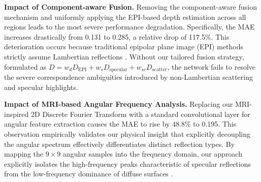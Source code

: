 \documentclass[lettersize,journal]{IEEEtran}
\begin{document}
\begin{table}[htbp]
\centering
\caption{Ablation study on key components of the proposed unified dual-mask physical model.}
\label{tab:ablation}
\end{table}

\textbf{Impact of Component-aware Fusion.} Removing the component-aware fusion mechanism and uniformly applying the EPI-based depth estimation across all regions leads to the most severe performance degradation. Specifically, the MAE increases drastically from 0.131 to 0.285, a relative drop of 117.5\%. This deterioration occurs because traditional epipolar plane image (EPI) methods strictly assume Lambertian reflections \cite{heber2018}. Without our tailored fusion strategy, formulated as $D = w_d D_{\text{EPI}} + w_s D_{\text{specular}} + w_{sc} D_{\text{scatter}}$, the network fails to resolve the severe correspondence ambiguities introduced by non-Lambertian scattering and specular highlights.

\textbf{Impact of MRI-based Angular Frequency Analysis.} Replacing our MRI-inspired 2D Discrete Fourier Transform with a standard convolutional layer for angular feature extraction causes the MAE to rise by 48.8\% to 0.195. This observation empirically validates our physical insight that explicitly decoupling the angular spectrum effectively differentiates distinct reflection types. By mapping the $9\times 9$ angular samples into the frequency domain, our approach explicitly isolates the high-frequency peaks characteristic of specular reflections from the low-frequency dominance of diffuse surfaces \cite{levin2011}.
\end{document}
